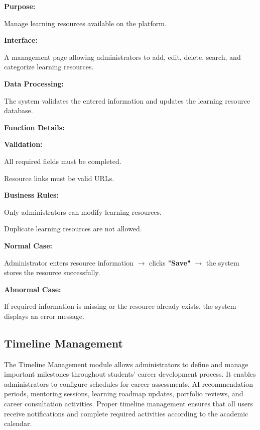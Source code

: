 \textbf{Purpose:}

Manage learning resources available on the platform.

\vspace{0.2cm}

\textbf{Interface:}

A management page allowing administrators to add, edit, delete, search, and categorize learning resources.

\vspace{0.2cm}

\textbf{Data Processing:}

The system validates the entered information and updates the learning resource database.

\vspace{0.3cm}

\textbf{Function Details:}

\textbf{Validation:}

All required fields must be completed.

Resource links must be valid URLs.

\textbf{Business Rules:}

Only administrators can modify learning resources.

Duplicate learning resources are not allowed.

\textbf{Normal Case:}

Administrator enters resource information $\rightarrow$ clicks \textbf{"Save"} $\rightarrow$ the system stores the resource successfully.

\textbf{Abnormal Case:}

If required information is missing or the resource already exists, the system displays an error message.


\subsection{Timeline Management}

The Timeline Management module allows administrators to define and manage important milestones throughout students' career development process. It enables administrators to configure schedules for career assessments, AI recommendation periods, mentoring sessions, learning roadmap updates, portfolio reviews, and career consultation activities. Proper timeline management ensures that all users receive notifications and complete required activities according to the academic calendar.

